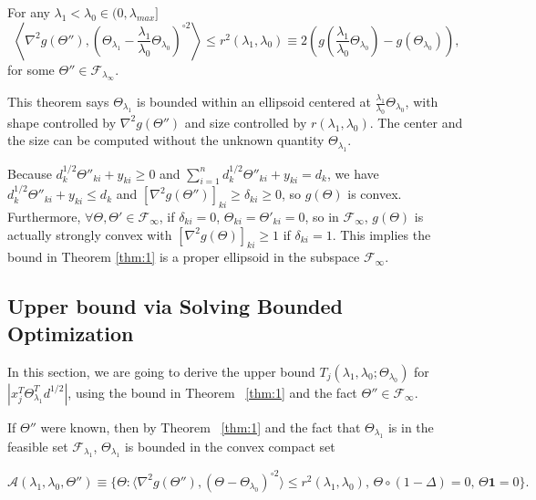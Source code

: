 \begin{theorem}
    \label{thm:1}
    For any $\lambda_1<\lambda_{0}\in (0,\lambda_{max}]$ 
    \begin{equation}
        \left\langle\nabla^2 g(\Theta''),\left(\Theta_{\lambda_1}-\frac{\lambda_1}{\lambda_0}\Theta_{\lambda_0}\right)^{\circ 2}\right\rangle\leq r^2(\lambda_1,\lambda_0)\equiv 2\left(g\left(\frac{\lambda_1}{\lambda_0}\Theta_{\lambda_0}\right)-g(\Theta_{\lambda_0})\right),
    \end{equation}
    for some $\Theta''\in\mathcal{F}_{\lambda_{\infty}}$.
\end{theorem}



This theorem says $\Theta_{\lambda_1}$ is bounded within an ellipsoid centered at $\frac{\lambda_1}{\lambda_0}\Theta_{\lambda_0}$, with shape controlled by $\nabla^2g(\Theta'')$ and size controlled by $r(\lambda_1,\lambda_0)$. The center and the size can be computed without the unknown quantity $\Theta_{\lambda_1}$.

 Because $d_k^{1/2}\Theta''_{ki}+y_{ki}\geq 0$ and $\sum_{i=1}^nd_k^{1/2}\Theta''_{ki}+y_{ki}=d_k$, we have $d_k^{1/2}\Theta''_{ki}+y_{ki}\leq d_k$ and $[\nabla^2 g(\Theta'')]_{ki}\geq\delta_{ki}\geq 0$, so $g(\Theta)$ is convex. Furthermore, $\forall\Theta,\Theta'\in\mathcal{F}_{\infty}$, if $\delta_{ki}=0$, $\Theta_{ki}=\Theta'_{ki}=0$, so in $\mathcal{F}_{\infty}$, $g(\Theta)$ is actually strongly convex with $[\nabla^2 g(\Theta)]_{ki}\geq 1$ if $\delta_{ki}=1$. This implies the bound in Theorem \ref{thm:1} is a proper ellipsoid in the subspace $\mathcal{F}_{\infty}$.

\subsection{Upper bound via Solving Bounded Optimization}

In this section, we are going to derive the upper bound $T_j(\lambda_1,\lambda_0;\Theta_{\lambda_0})$ for $|x_j^T\Theta^T_{\lambda_1}d^{1/2}|$, using the bound in Theorem ~\ref{thm:1} and the fact $\Theta''\in\mathcal{F}_{\infty}$.

If $\Theta''$ were known, then by Theorem ~\ref{thm:1} and the fact that $\Theta_{\lambda_1}$ is in the feasible set $\mathcal{F}_{\lambda_1}$, $\Theta_{\lambda_1}$ is bounded in the convex compact set

 \begin{equation}
     \mathcal{A}(\lambda_1,{\lambda_0},\Theta'')\equiv\{\Theta:\langle\nabla^2 g(\Theta''),(\Theta-\Theta_{\lambda_0})^{\circ 2}\rangle\leq r^2(\lambda_1,\lambda_0),\,\Theta\circ(1-\Delta)=0,\, \Theta\mathbf{1}=0\}.
 \end{equation}

